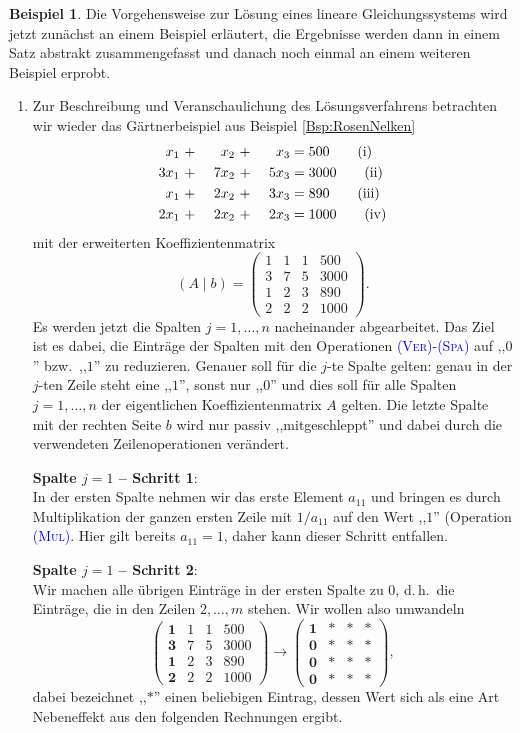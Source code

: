 \documentclass[a4paper,11pt,oneside]{article}
\theoremstyle{definition}
\newtheorem{example}{Beispiel}
\def\RM#1{\uppercase\expandafter{\romannumeral #1\relax}}
\def\OP#1{\textcolor{blue}{(\textnormal{\textrm{\textsc{#1}})}}}
\begin{document}
\begin{example}\label{Bsp:LGSRosen}
Die Vorgehensweise zur Lösung eines lineare Gleichungssystems wird jetzt zunächst an einem Beispiel erläutert, die Ergebnisse werden dann in einem Satz abstrakt zusammengefasst und danach noch einmal an einem weiteren Beispiel erprobt.
\begin{enumerate}
\item
Zur Beschreibung und Veranschaulichung des Lösungsverfahrens
betrachten wir wieder das Gärtnerbeispiel aus Beispiel \ref{Bsp:RosenNelken}
\begin{alignat}{3}
x_1&\ +\ &x_2&\ +\ &x_3&=500 \tag{\RM{1}}\\
3x_1&\ +\ &7x_2&\ +\ &5x_3&=3000 \tag{\RM{2}}\\
x_1&\ +\ &2x_2&\ +\ &3x_3&=890 \tag{\RM{3}}\\
2x_1&\ +\ &2x_2&\ +\ &2x_3&=1000\tag{\RM{4}}
\end{alignat}
mit der erweiterten Koeffizientenmatrix
$$
(A\mid b)=\left(\begin{array}{ccc|c}
1&1&1&500\\
3&7&5&3000\\
1&2&3&890\\
2&2&2&1000
\end{array}\right).
$$
Es werden jetzt die Spalten $j=1,\ldots,n$ nacheinander abgearbeitet. Das Ziel ist es dabei, die Einträge der Spalten mit den Operationen \OP{Ver}-\OP{Spa} auf ,,$0$'' bzw.\ ,,$1$'' zu reduzieren. Genauer soll für die $j$-te Spalte gelten: genau in der $j$-ten Zeile steht eine ,,$1$'', sonst nur ,,$0$'' und dies soll für alle Spalten $j=1,\ldots,n$ der eigentlichen Koeffizientenmatrix $A$ gelten. Die letzte Spalte mit der rechten Seite $b$ wird nur passiv ,,mitgeschleppt'' und dabei durch die verwendeten Zeilenoperationen verändert.

\textbf{Spalte $j=1$ -- Schritt 1}:~\\
In der ersten Spalte nehmen wir das erste Element $ a_{11}$ und bringen es durch     Multiplikation der ganzen ersten Zeile mit $1/a_{11}$ auf den Wert ,,$1$'' (Operation \OP{Mul}. Hier gilt bereits $a_{11}=1$, daher kann dieser Schritt entfallen.

\textbf{Spalte $j=1$ -- Schritt 2}:~\\
Wir machen alle übrigen Einträge in der ersten Spalte zu $0$, d.\,h.\ die Einträge, die in den Zeilen $2,\ldots,m$ stehen. Wir wollen also umwandeln
$$
\left(\begin{array}{ccc|c}
\mathbf{1}&1&1&500\\
\mathbf{3}&7&5&3000\\
\mathbf{1}&2&3&890\\
\mathbf{2}&2&2&1000
\end{array}\right)
\longrightarrow
\left(\begin{array}{ccc|c}
\mathbf{1}&*&*&*\\
\mathbf{0}&*&*&*\\
\mathbf{0}&*&*&*\\
\mathbf{0}&*&*&*
\end{array}\right),
$$
dabei bezeichnet ,,$*$'' einen beliebigen Eintrag, dessen Wert sich als eine Art Nebeneffekt aus den folgenden Rechnungen ergibt.


\end{enumerate}
\end{example}
\end{document}
